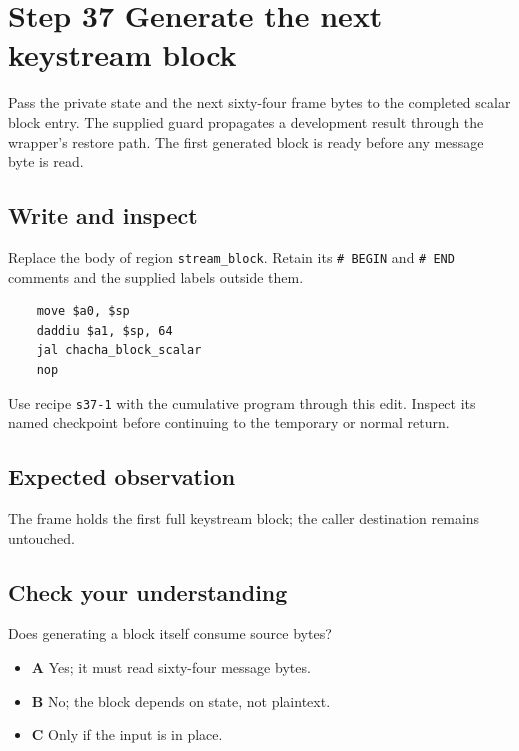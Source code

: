 \section{Step 37 Generate the next keystream block}\label{chacha-s37}

Pass the private state and the next sixty-four frame bytes to the completed scalar block entry. The supplied guard propagates a development result through the wrapper's restore path. The first generated block is ready before any message byte is read.

\subsection{Write and inspect}
Replace the body of region \texttt{stream\_block}. Retain its \texttt{\# BEGIN} and \texttt{\# END} comments and the supplied labels outside them.

\begin{verbatim}
    move $a0, $sp
    daddiu $a1, $sp, 64
    jal chacha_block_scalar
    nop
\end{verbatim}

Use recipe \texttt{s37-1} with the cumulative program through this edit. Inspect its named checkpoint before continuing to the temporary or normal return.

\subsection{Expected observation}
The frame holds the first full keystream block; the caller destination remains untouched.

\subsection{Check your understanding}
Does generating a block itself consume source bytes?

\begin{itemize}
  \item \textbf{A} Yes; it must read sixty-four message bytes.
  \item \textbf{B} No; the block depends on state, not plaintext.
  \item \textbf{C} Only if the input is in place.
\end{itemize}
